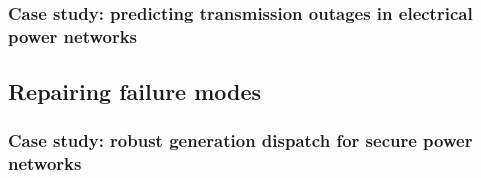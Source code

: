 
\subsubsection{Case study: predicting transmission outages in electrical power networks}





\subsection{Repairing failure modes}




\subsubsection{Case study: robust generation dispatch for secure power networks}




